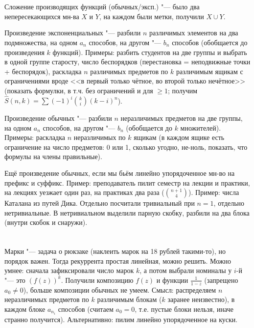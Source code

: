 \section{} %
	Сложение производящих функций (обычных/эксп.) "--- было два непересекающихся мн-ва
	$X$ и $Y$, на каждом были метки, получили $X \cup Y$.
	
	Произведение экспоненциальных "--- разбили $n$ различимых элементов на два подмножества,
	на одном $a_n$ способов, на другом "--- $b_n$ способов (обобщается до произведения $k$ функций).
	Примеры: разбить студентов на две группы и выбрать в одной группе старосту,
	число беспорядков (перестановка = неподвижные точки + беспорядок),
	раскладка $n$ различимых предметов по $k$ различимым ящикам с ограничениями
	вроде <<в первый только чётное, во второй только нечётное>> (показать формулки,
	в т.ч. без ограничений и для $\ge1$; получим $\hat S(n,k)=\sum (-1)^i\binom{k}{i}(k-i)^n$).

	Произведение обычных "--- разбили $n$ неразличимых предметов на две группы,
	на одном $a_n$ способов, на другом "--- $b_n$ (обобщается до $k$ множителей).
	Примеры: раскладка $n$ неразличимых по $k$ ящикам (в каждом ящике есть ограничение на
	число предметов: 0 или 1, сколько угодно, не-ноль, показать, что формулы на члены правильные).

	Ещё произведение обычных, если мы бьём линейно упорядоченное мн-во на префикс и суффикс.
	Пример: преподаватель пилит семестр на лекции и практики, на лекциях уезжает один раз, на практиках два раза
	($\binom{n+1}{4}$).
	Пример: числа Каталана из путей Дика.
	Отдельно посчитали тривиальный при $n=1$, отдельно нетривиальные.
	В нетривиальном выделили парную скобку, разбили на два блока (внутри скобок и снаружи).

\section{} %
	Марки "--- задача о рюкзаке (наклеить марок на 18 рублей такими-то), но порядок важен.
	Тогда рекуррента простая линейная, можно решить.
	Можно умнее: сначала зафиксировали число марок $k$, а потом
	выбрали номиналы у $i$-й "--- это $(f(z))^k$.
	Получили композицию $f(z)$ и функции $\frac{1}{1-z}$ (запрещено $a_0 \neq 0$),
	больше композиции обычных не умеем.
	Смысл: распределяем $n$ неразличимых предметов по $k$ различимым блокам ($k$ заранее неизвестно),
	в каждом блоке $a_{n_i}$ способов (считаем $a_0=0$, т.е. пустые блоки нельзя, иначе странно получится).
	Альтернативно: пилим линейно упорядоченное на куски.

